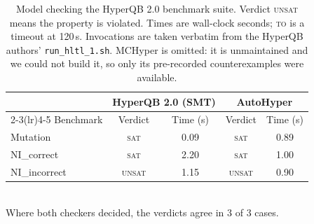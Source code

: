 \newcommand{\to}{\textsc{to}}
\newcommand{\err}{\textsc{err}}
\newcommand{\sat}{\textsc{sat}}
\newcommand{\unsat}{\textsc{unsat}}

\begin{table}[t]
  \centering
  \caption{Model checking the HyperQB 2.0 benchmark suite. Verdict  \unsat{} means the property is violated. Times are wall-clock  seconds; \to{} is a timeout at 120\,s. Invocations are taken  verbatim from the HyperQB authors' \texttt{run\_hltl\_1.sh}.  MCHyper is omitted: it is unmaintained and we could not build it,  so only its pre-recorded counterexamples were available.}
  \label{tab:checkers}
  \begin{tabular}{lcccc}
    \toprule
    & \multicolumn{2}{c}{HyperQB 2.0 (SMT)} & \multicolumn{2}{c}{AutoHyper} \\
    \cmidrule(lr){2-3}\cmidrule(lr){4-5}
    Benchmark & Verdict & Time (s) & Verdict & Time (s) \\
    \midrule
    Mutation & \sat & 0.09 & \sat & 0.89 \\
    NI\_correct & \sat & 2.20 & \sat & 1.00 \\
    NI\_incorrect & \unsat & 1.15 & \unsat & 0.90 \\
    \bottomrule
  \end{tabular}
  \\[2pt]
  \footnotesize Where both checkers decided, the verdicts agree in 3 of 3 cases.
\end{table}
